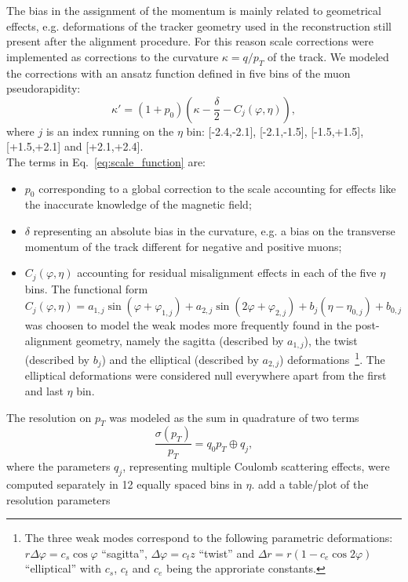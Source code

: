 The bias in the assignment of the momentum is mainly
related to geometrical effects, e.g. deformations of the tracker
geometry used in the reconstruction still present after the
alignment procedure.
For this reason scale corrections were implemented as corrections to the curvature
$\kappa=q/p_T$ of the track. We modeled the corrections with an ansatz function defined in five
bins of the muon pseudorapidity: 
\begin{equation}
\kappa' = (1+p_0) \left( \kappa -\frac{\delta}{2} - C_j(\varphi,\eta)  \right),
\label{eq:scale_function}
\end{equation}
where $j$ is an index running on the $\eta$ bin: [-2.4,-2.1],
[-2.1,-1.5], [-1.5,+1.5], [+1.5,+2.1] and [+2.1,+2.4].\\
The terms in Eq.~\ref{eq:scale_function} are:
\begin{itemize}
\item $p_0$ corresponding to a global correction to the scale accounting for effects
  like the inaccurate knowledge of the magnetic field;
\item $\delta$ representing an absolute bias in the curvature, e.g. a
  bias on the transverse momentum of the track different for negative
  and positive muons;
\item $C_j(\varphi,\eta)$ accounting for residual misalignment effects
  in each of the five $\eta$ bins.
  The functional form 
  \[
  C_j(\varphi,\eta) = a_{1,j} \sin(\varphi+\varphi_{1,j}) + a_{2,j}
  \sin(2\varphi+\varphi_{2,j}) + b_j(\eta-\eta_{0,j}) + b_{0,j} 
  \]
  was choosen to model the weak modes more frequently
  found in the post-alignment geometry, namely the sagitta (described
  by $a_{1,j}$), the
  twist (described by $b_j$) and the elliptical (described
  by $a_{2,j}$) deformations~\footnote{
    The three weak modes correspond to the following parametric deformations:
    $r\Delta\varphi = c_s \cos\varphi$ ``sagitta'',
    $\Delta\varphi = c_t z$  ``twist'' and 
    $\Delta r = r (1- c_e \cos 2\varphi)$  ``elliptical''
    with $c_s$, $c_t$ and $c_e$ being the approriate constants.}. 
  The elliptical deformations were considered null everywhere apart from 
  the first and last $\eta$ bin.
\end{itemize}
The resolution on $p_T$ was modeled as the sum in quadrature of two terms
\begin{equation}
\frac{\sigma(p_T)}{p_T}=q_0 p_T \oplus q_j ,
\label{eq:resolution_function}
\end{equation}
where the parameters $q_j$, representing multiple Coulomb scattering
effects, were computed separately in 12 equally spaced bins in $\eta$. 
\FIXME add a table/plot of the resolution parameters 
